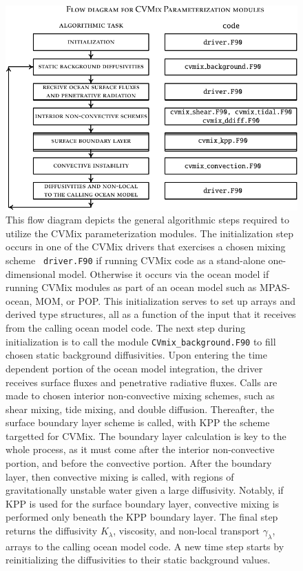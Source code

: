 \begin{figure}[h!t]
\begin{center}
\includegraphics[angle=0,width=15cm,bb=0 0 353 247]{./mfpic_figs/cvmix_flow_diagram.pdf}
\caption[Flow diagram for CVMix schemes]{\sf This flow diagram depicts
  the general algorithmic steps required to utilize the CVMix
  parameterization modules.  The initialization step occurs in one of
  the CVMix drivers that exercises a chosen mixing scheme {\tt
    driver.F90} if running CVMix code as a stand-alone one-dimensional
  model.  Otherwise it occurs via the ocean model if running CVMix
  modules as part of an ocean model such as MPAS-ocean, MOM, or POP.
  This initialization serves to set up arrays and derived type
  structures, all as a function of the input that it receives from the
  calling ocean model code.  The next step during initialization is to
  call the module {\tt CVmix\_background.F90} to fill chosen static
  background diffusivities.  Upon entering the time dependent portion
  of the ocean model integration, the driver receives surface fluxes
  and penetrative radiative fluxes.  Calls are made to chosen interior
  non-convective mixing schemes, such as shear mixing, tide mixing,
  and double diffusion.  Thereafter, the surface boundary layer scheme
  is called, with KPP the scheme targetted for CVMix.  The boundary
  layer calculation is key to the whole process, as it must come after
  the interior non-convective portion, and before the convective
  portion.  After the boundary layer, then convective mixing is
  called, with regions of gravitationally unstable water given a large
  diffusivity.  Notably, if KPP is used for the surface boundary
  layer, convective mixing is performed only beneath the KPP boundary
  layer.  The final step returns the diffusivity $K_{\lambda}$,
  viscosity, and non-local transport $\gamma_{\lambda}$, arrays to the
  calling ocean model code.  A new time step starts by reinitializing
  the diffusivities to their static background values.}
\label{fig:vertical_mix_flow_cvmix}
\end{center}
\end{figure}



